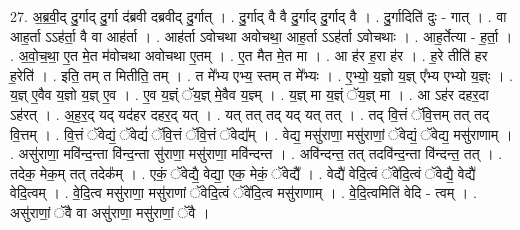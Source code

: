 \documentclass[17pt]{extarticle}
\begin{document}
27. अ॒ब्र॒वी॒द् दु॒र्गाद् दु॒र्गा द॑ब्रवी दब्रवीद् दु॒र्गात् । . दु॒र्गाद् वै वै दु॒र्गाद् दु॒र्गाद् वै । . दु॒र्गादिति॑ दुः - गात् । . वा आह॒र्ता ऽऽह॑र्ता॒ वै वा आह॑र्ता । . आह॑र्ता ऽवोचथा अवोचथा॒ आह॒र्ता ऽऽह॑र्ता ऽवोचथाः । . आह॒र्तेत्या - ह॒र्ता॒ । . अ॒वो॒च॒था॒ ए॒त मे॒त म॑वोचथा अवोचथा ए॒तम् । . ए॒त मैत मे॒त मा । . आ ह॑र ह॒रा ह॑र । . ह॒रे तीति॑ हर ह॒रेति॑ । . इति॒ तम् त मितीति॒ तम् । . त मे᳚भ्य एभ्य॒ स्तम् त मे᳚भ्यः । . ए॒भ्यो॒ य॒ज्ञो य॒ज्ञ् ए᳚भ्य एभ्यो य॒ज्ञ्ः । . य॒ज्ञ् ए॒वैव य॒ज्ञो य॒ज्ञ् ए॒व । . ए॒व य॒ज्ञ्ं ॅय॒ज्ञ् मे॒वैव य॒ज्ञ्म् । . य॒ज्ञ् मा य॒ज्ञ्ं ॅय॒ज्ञ् मा । . आ ऽह॑र दहर॒दा ऽह॑रत् । . अ॒ह॒र॒द् यद् यद॑हर दहर॒द् यत् । . यत् तत् तद् यद् यत् तत् । . तद् वि॒त्तं ॅवि॒त्तम् तत् तद् वि॒त्तम् । . वि॒त्तं ॅवेद्यं॒ ॅवेद्यं॑ ॅवि॒त्तं ॅवि॒त्तं ॅवेद्य᳚म् । . वेद्य॒ मसु॑राणा॒ मसु॑राणां॒ ॅवेद्यं॒ ॅवेद्य॒ मसु॑राणाम् । . असु॑राणा॒ मवि॑न्द॒न्ता वि॑न्द॒न्ता सु॑राणा॒ मसु॑राणा॒ मवि॑न्दन्त । . अवि॑न्दन्त॒ तत् तदवि॑न्द॒न्ता वि॑न्दन्त॒ तत् । . तदेक॒ मेक॒म् तत् तदेक᳚म् । . एकं॒ ॅवेद्यै॒ वेद्या॒ एक॒ मेकं॒ ॅवेद्यै᳚ । . वेद्यै॑ वेदि॒त्वं ॅवे॑दि॒त्वं ॅवेद्यै॒ वेद्यै॑ वेदि॒त्वम् । . वे॒दि॒त्व मसु॑राणा॒ मसु॑राणां ॅवेदि॒त्वं ॅवे॑दि॒त्व मसु॑राणाम् । . वे॒दि॒त्वमिति॑ वेदि - त्वम् । . असु॑राणां॒ ॅवै वा असु॑राणा॒ मसु॑राणां॒ ॅवै । \newline
\end{document}
